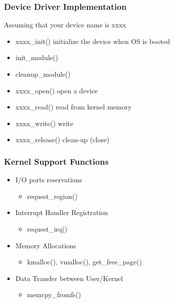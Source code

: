 % 
% 
\begin{frame}[fragile]
    \frametitle{Device Driver Implementation}
Assuming that your device name is xxxx
    \begin{itemize}
        \item xxxx\_init() initialize the device when OS is booted
        \item init\_module()
        \item cleanup\_module() \pause
        \item xxxx\_open() open a device 
        \item xxxx\_read() read from kernel memory 
        \item xxxx\_write() write 
        \item xxxx\_release() clean-up (close)
    \end{itemize}
\end{frame}
% 
% 
\begin{frame}[fragile]
    \frametitle{Kernel Support Functions}
    \begin{itemize}
        \item I/O ports reservations
        \begin{itemize}
            \item request\_region()
        \end{itemize}
        \item Interrupt Handler Registration
        \begin{itemize}
            \item request\_irq()
        \end{itemize} \pause
        \item Memory Allocations   
        \begin{itemize}
            \item kmalloc(), vmalloc(), get\_free\_page()
        \end{itemize} \pause
        \item Data Transfer between User/Kernel
        \begin{itemize}
            \item memcpy\_fromfs()
        \end{itemize}
    \end{itemize}
\end{frame}
% 
% 
